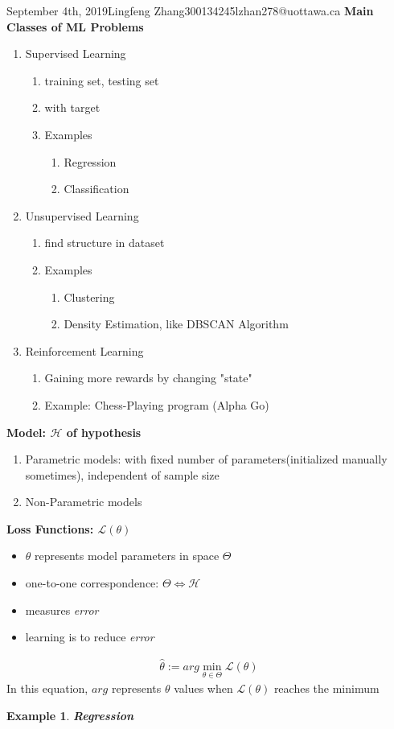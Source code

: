 \documentclass{article}
\newtheorem{ex}{Example}
\begin{document}
\begin{lecture}{September 4th, 2019}{Lingfeng Zhang}{300134245}{lzhan278@uottawa.ca}
\textbf{Main Classes of ML Problems}
\begin{enumerate}
\item Supervised Learning
	\begin{enumerate}
	\item training set, testing set
	\item with target
	\item Examples
		\begin{enumerate}
		\item Regression
		\item Classification
		\end{enumerate}
	\end{enumerate}
\item Unsupervised Learning
	\begin{enumerate}
	\item find structure in dataset
	\item Examples
		\begin{enumerate}
		\item Clustering
		\item Density Estimation, like DBSCAN Algorithm
		\end{enumerate}
	\end{enumerate}
\item Reinforcement Learning
	\begin{enumerate}
	\item Gaining more rewards by changing "state"
	\item Example: Chess-Playing program (Alpha Go)
	\end{enumerate}
\end{enumerate}

\textbf{Model: $\mathcal{H}$ of hypothesis}
\begin{enumerate}
\item Parametric models: with fixed number of parameters(initialized manually sometimes), independent of sample size
\item Non-Parametric models
\end{enumerate}

\textbf{Loss Functions: $\mathcal{L}(\theta)$}

\begin{itemize}
\item $\theta$ represents model parameters in space $\Theta$
\item one-to-one correspondence: $\Theta\Longleftrightarrow\mathcal{H}$
\item measures \textit{error}
\item learning is to reduce \textit{error}
\end{itemize}
\begin{eqnarray}
\hat\theta:=arg\min\limits_{\theta\in\Theta}\mathcal{L}(\theta)
\end{eqnarray}
In this equation, $arg$ represents $\theta$ values when $\mathcal{L}(\theta)$ reaches the minimum
\begin{ex}
\textbf{Regression}


\end{ex}
\end{lecture}
\end{document}
